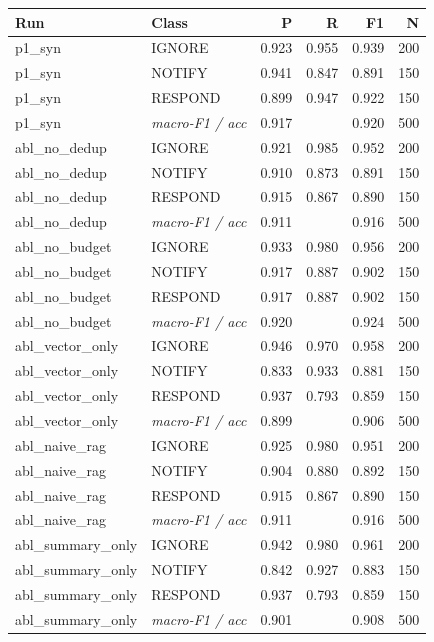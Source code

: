 \begin{tabular}{llrrrr}
\toprule
Run & Class & P & R & F1 & N \\
\midrule
p1_syn & IGNORE & 0.923 & 0.955 & 0.939 & 200 \\
p1_syn & NOTIFY & 0.941 & 0.847 & 0.891 & 150 \\
p1_syn & RESPOND & 0.899 & 0.947 & 0.922 & 150 \\
p1_syn & \textit{macro-F1 / acc} & 0.917 &  & 0.920 & 500 \\
abl_no_dedup & IGNORE & 0.921 & 0.985 & 0.952 & 200 \\
abl_no_dedup & NOTIFY & 0.910 & 0.873 & 0.891 & 150 \\
abl_no_dedup & RESPOND & 0.915 & 0.867 & 0.890 & 150 \\
abl_no_dedup & \textit{macro-F1 / acc} & 0.911 &  & 0.916 & 500 \\
abl_no_budget & IGNORE & 0.933 & 0.980 & 0.956 & 200 \\
abl_no_budget & NOTIFY & 0.917 & 0.887 & 0.902 & 150 \\
abl_no_budget & RESPOND & 0.917 & 0.887 & 0.902 & 150 \\
abl_no_budget & \textit{macro-F1 / acc} & 0.920 &  & 0.924 & 500 \\
abl_vector_only & IGNORE & 0.946 & 0.970 & 0.958 & 200 \\
abl_vector_only & NOTIFY & 0.833 & 0.933 & 0.881 & 150 \\
abl_vector_only & RESPOND & 0.937 & 0.793 & 0.859 & 150 \\
abl_vector_only & \textit{macro-F1 / acc} & 0.899 &  & 0.906 & 500 \\
abl_naive_rag & IGNORE & 0.925 & 0.980 & 0.951 & 200 \\
abl_naive_rag & NOTIFY & 0.904 & 0.880 & 0.892 & 150 \\
abl_naive_rag & RESPOND & 0.915 & 0.867 & 0.890 & 150 \\
abl_naive_rag & \textit{macro-F1 / acc} & 0.911 &  & 0.916 & 500 \\
abl_summary_only & IGNORE & 0.942 & 0.980 & 0.961 & 200 \\
abl_summary_only & NOTIFY & 0.842 & 0.927 & 0.883 & 150 \\
abl_summary_only & RESPOND & 0.937 & 0.793 & 0.859 & 150 \\
abl_summary_only & \textit{macro-F1 / acc} & 0.901 &  & 0.908 & 500 \\
\bottomrule
\end{tabular}
